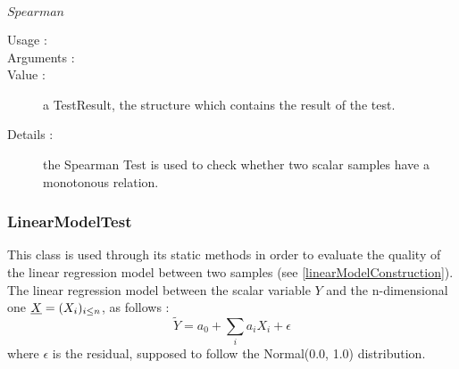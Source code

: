 \begin{description}
\begin{description}
  \item $Spearman$
    \begin{description}
    \item[Usage :] \rule{0pt}{1em}
    \item[Arguments :] \rule{0pt}{1em}
    \item[Value :]  a TestResult, the structure which contains the result of the test.
    \item[Details :] the Spearman Test is used to check whether two scalar samples have a monotonous relation.
    \end{description}

  \end{description}

\end{description}





\newpage       \subsubsection{LinearModelTest}

This class is used through its static methods in order to evaluate the quality of the linear regression model between two samples (see \ref{linearModelConstruction}).
The linear regression model between the scalar variable $Y$ and the n-dimensional one ${\underline{X}} = (X_i)_{i \leq n}$, as follows :
$$
\tilde{Y} = a_0 + \sum_i a_i X_i + \epsilon
$$
where $\epsilon$ is the residual, supposed to follow the Normal(0.0, 1.0) distribution.\\


